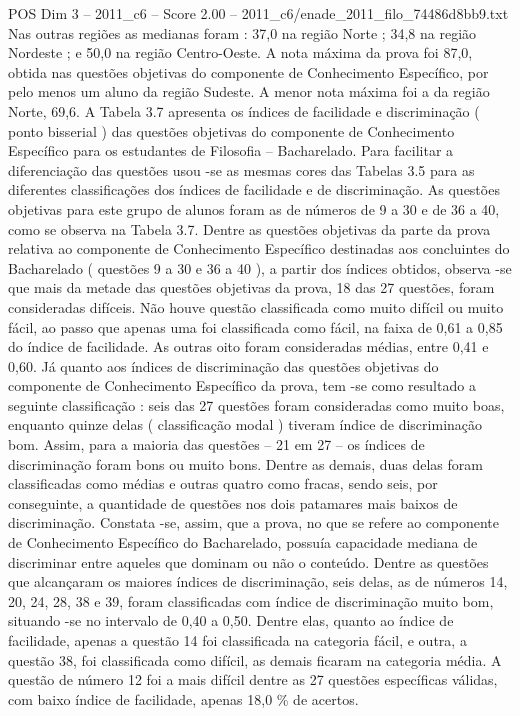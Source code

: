 \begin{textsample}{POS Dim 3 – 2011\_c6 – Score 2.00 – 2011\_c6/enade\_2011\_filo\_74486d8bb9.txt}
Nas outras regiões as medianas foram : 37,0 na região Norte ; 34,8 na região Nordeste ; e 50,0 na região Centro-Oeste.
A nota máxima da prova foi 87,0, obtida nas questões objetivas do componente de Conhecimento Específico, por pelo menos um aluno da região Sudeste.
A menor nota máxima foi a da região Norte, 69,6.
A Tabela 3.7 apresenta os índices de facilidade e discriminação ( ponto bisserial ) das questões objetivas do componente de Conhecimento Específico para os estudantes de Filosofia – Bacharelado.
Para facilitar a diferenciação das questões usou -se as mesmas cores das Tabelas 3.5 para as diferentes classificações dos índices de facilidade e de discriminação.
As questões objetivas para este grupo de alunos foram as de números de 9 a 30 e de 36 a 40, como se observa na Tabela 3.7.
Dentre as questões objetivas da parte da prova relativa ao componente de Conhecimento Específico destinadas aos concluintes do Bacharelado ( questões 9 a 30 e 36 a 40 ), a partir dos índices obtidos, observa -se que mais da metade das questões objetivas da prova, 18 das 27 questões, foram consideradas difíceis.
Não houve questão classificada como muito difícil ou muito fácil, ao passo que apenas uma foi classificada como fácil, na faixa de 0,61 a 0,85 do índice de facilidade.
As outras oito foram consideradas médias, entre 0,41 e 0,60.
Já quanto aos índices de discriminação das questões objetivas do componente de Conhecimento Específico da prova, tem -se como resultado a seguinte classificação : seis das 27 questões foram consideradas como muito boas, enquanto quinze delas ( classificação modal ) tiveram índice de discriminação bom.
Assim, para a maioria das questões – 21 em 27 – os índices de discriminação foram bons ou muito bons.
Dentre as demais, duas delas foram classificadas como médias e outras quatro como fracas, sendo seis, por conseguinte, a quantidade de questões nos dois patamares mais baixos de discriminação.
Constata -se, assim, que a prova, no que se refere ao componente de Conhecimento Específico do Bacharelado, possuía capacidade mediana de discriminar entre aqueles que dominam ou não o conteúdo.
Dentre as questões que alcançaram os maiores índices de discriminação, seis delas, as de números 14, 20, 24, 28, 38 e 39, foram classificadas com índice de discriminação muito bom, situando -se no intervalo de 0,40 a 0,50.
Dentre elas, quanto ao índice de facilidade, apenas a questão 14 foi classificada na categoria fácil, e outra, a questão 38, foi classificada como difícil, as demais ficaram na categoria média.
A questão de número 12 foi a mais difícil dentre as 27 questões específicas válidas, com baixo índice de facilidade, apenas 18,0 \% de acertos.

\end{textsample}
